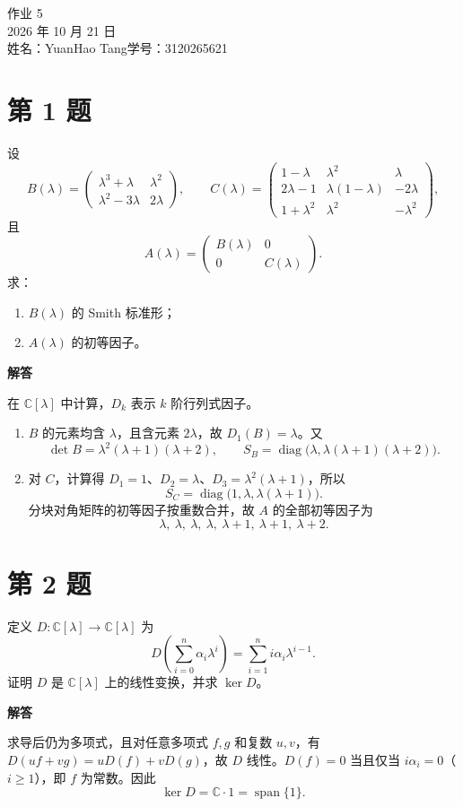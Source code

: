 \documentclass[UTF8,10pt,letterpaper,fontset=fandol]{ctexart}
\newcommand{\C}{\mathbb C}
\newcommand{\Solution}{\par\Needspace{4\baselineskip}\textbf{解答}\par}
\begin{document}
\begin{center}
{\LARGE 作业 5}\\[0.6em]
2026 年 10 月 21 日\\[0.25em]
姓名：YuanHao Tang\quad 学号：3120265621
\end{center}

\section{第 1 题}
设
\[
B(\lambda)=\begin{pmatrix}\lambda^3+\lambda&\lambda^2\\\lambda^2-3\lambda&2\lambda\end{pmatrix},\qquad
C(\lambda)=\begin{pmatrix}
1-\lambda&\lambda^2&\lambda\\
2\lambda-1&\lambda(1-\lambda)&-2\lambda\\
1+\lambda^2&\lambda^2&-\lambda^2
\end{pmatrix},
\]
且
\[
A(\lambda)=\begin{pmatrix}B(\lambda)&0\\0&C(\lambda)\end{pmatrix}.
\]
求：
\begin{enumerate}
\item $B(\lambda)$ 的 Smith 标准形；
\item $A(\lambda)$ 的初等因子。
\end{enumerate}
\Solution
在 $\C[\lambda]$ 中计算，$D_k$ 表示 $k$ 阶行列式因子。
\begin{enumerate}
\item $B$ 的元素均含 $\lambda$，且含元素 $2\lambda$，故 $D_1(B)=\lambda$。又
\[
\det B=\lambda^2(\lambda+1)(\lambda+2),
\qquad\boxed{S_B=\operatorname{diag}\bigl(\lambda,\lambda(\lambda+1)(\lambda+2)\bigr)}.
\]
\item 对 $C$，计算得 $D_1=1$、$D_2=\lambda$、$D_3=\lambda^2(\lambda+1)$，所以
\[
S_C=\operatorname{diag}\bigl(1,\lambda,\lambda(\lambda+1)\bigr).
\]
分块对角矩阵的初等因子按重数合并，故 $A$ 的全部初等因子为
\[
\boxed{\lambda,\ \lambda,\ \lambda,\ \lambda,\ \lambda+1,\ \lambda+1,\ \lambda+2}.
\]
\end{enumerate}

\section{第 2 题}
定义 $D:\C[\lambda]\to\C[\lambda]$ 为
\[
D\!\left(\sum_{i=0}^n\alpha_i\lambda^i\right)=\sum_{i=1}^n i\alpha_i\lambda^{i-1}.
\]
证明 $D$ 是 $\C[\lambda]$ 上的线性变换，并求 $\ker D$。
\Solution
求导后仍为多项式，且对任意多项式 $f,g$ 和复数 $u,v$，有
$D(uf+vg)=uD(f)+vD(g)$，故 $D$ 线性。$D(f)=0$ 当且仅当 $i\alpha_i=0$（$i\ge1$），即 $f$ 为常数。因此
\[
\boxed{\ker D=\C\cdot1=\operatorname{span}\{1\}}.
\]
\end{document}
